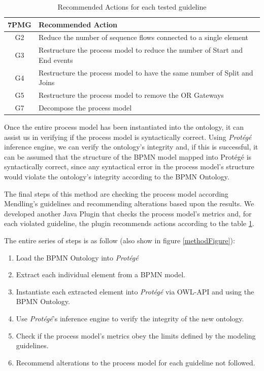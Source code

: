 \documentclass[a4paper,twoside]{article}
\begin{document}
\begin{table}[]
	\centering
	\caption{Recommended Actions for each tested guideline}
	\label{RecommendedActions}
	\begin{tabular}{|c|p{5.5cm}|}
		\hline
		7PMG & Recommended Action \\ \hline
		G2 & Reduce the number of sequence flows connected to a single element \\ \hline
		G3 & Restructure the process model to reduce the number of Start and End events \\ \hline
		G4 & Restructure the process model to have the same number of Split and Joins \\ \hline
		G5 & Restructure the process model to remove the OR Gateways \\ \hline
		G7 & Decompose the process model \\ \hline
	\end{tabular}
\end{table}

Once the entire process model has been instantiated into the ontology, it can assist us in verifying if the process model is syntactically correct.  Using \textit{Protégé} inference engine, we can verify the ontology's integrity and, if this is successful, it can be assumed that the structure of the BPMN model mapped into Protégé is syntactically correct, since any syntactical error in the process model's structure would violate the ontology's integrity according to the BPMN Ontology.

The final steps of this method are checking the process model according Mendling's guidelines and recommending alterations based upon the results. We developed another Java Plugin that checks the process model's metrics and, for each violated guideline, the plugin recommends actions according to the table \ref{RecommendedActions}.



The entire series of steps is as follow (also show in figure \ref{methodFigure}):

\begin{enumerate}
	\item Load the BPMN Ontology into \textit{Protégé}
	\item Extract each individual element from a BPMN model.
	\item Instantiate each extracted element into \textit{Protégé} via OWL-API and using the BPMN Ontology.
	\item Use \textit{Protégé}'s inference engine to verify the integrity of the new ontology.
	\item Check if the process model's metrics obey the limits defined by the modeling guidelines.
	\item Recommend alterations to the process model for each guideline not followed.
\end{enumerate}
\end{document}
